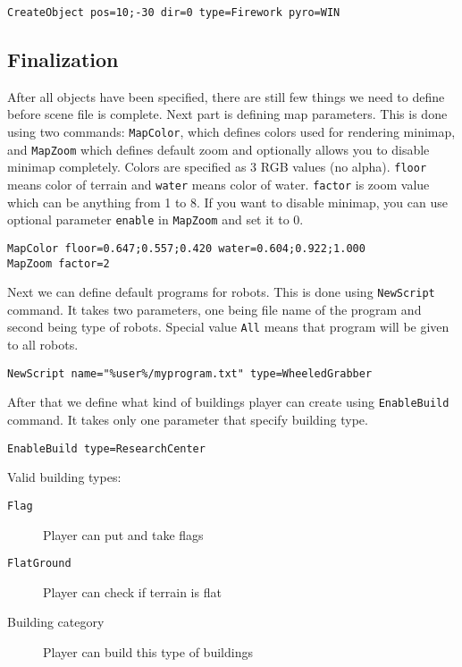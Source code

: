 \begin{verbatim}
CreateObject pos=10;-30 dir=0 type=Firework pyro=WIN
\end{verbatim}


\subsection{Finalization}

After all objects have been specified, there are still few things we need to define before scene file is complete. Next part is defining map parameters. This is done using two commands: \texttt{MapColor}, which defines colors used for rendering minimap, and \texttt{MapZoom} which defines default zoom and optionally allows you to disable minimap completely. Colors are specified as 3 RGB values (no alpha). \texttt{floor} means color of terrain and \texttt{water} means color of water. \texttt{factor} is zoom value which can be anything from 1 to 8. If you want to disable minimap, you can use optional parameter \texttt{enable} in \texttt{MapZoom} and set it to 0.

\begin{verbatim}
MapColor floor=0.647;0.557;0.420 water=0.604;0.922;1.000
MapZoom factor=2
\end{verbatim}

Next we can define default programs for robots. This is done using \texttt{NewScript} command. It takes two parameters, one being file name of the program and second being type of robots. Special value \texttt{All} means that program will be given to all robots.

\begin{verbatim}
NewScript name="%user%/myprogram.txt" type=WheeledGrabber
\end{verbatim}

After that we define what kind of buildings player can create using \texttt{EnableBuild} command. It takes only one parameter that specify building type.

\begin{verbatim}
EnableBuild type=ResearchCenter
\end{verbatim}

Valid building types:


\begin{description}
    \item[\texttt{Flag}] Player can put and take flags
    \item[\texttt{FlatGround}] Player can check if terrain is flat
    \item[Building category] Player can build this type of buildings
\end{description}

